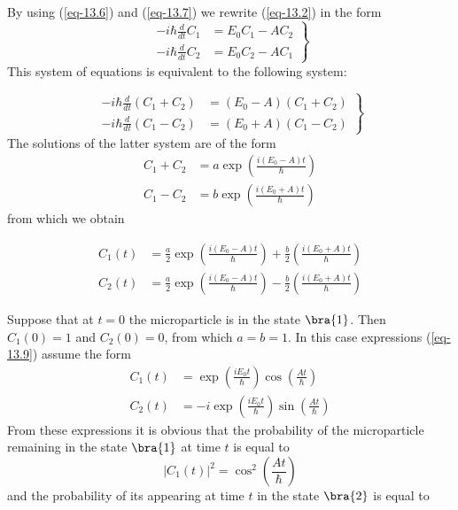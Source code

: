 \documentclass[a4paper,sfsidenotes,colorlinks=true]{tufte-book}
\numberwithin{equation}{section}
\numberwithin{figure}{section}
\begin{document}
\begin{description}
By using (\ref{eq-13.6}) and (\ref{eq-13.7})  we rewrite (\ref{eq-13.2}) in the form 
\begin{equation}%
\left.
\begin{split}
- i \hbar \frac{d}{dt} C_{1} & = E_{0}C_{1} - AC_{2} \\
- i \hbar \frac{d}{dt} C_{2} & = E_{0}C_{2} - AC_{1}
\end{split}
\right\}
\label{eq-13.8}
\end{equation}
This system of equations is equivalent to the following system:

\begin{equation*}%
\left.
\begin{split}
- i \hbar \frac{d}{dt} \left( C_{1} +  C_{2} \right) & = (E_{0} - A)( C_{1} +C_{2}) \\
- i \hbar \frac{d}{dt} \left( C_{1} -  C_{2} \right) & = (E_{0} + A)(
C_{1} - C_{2})
\end{split}
\right\}
\end{equation*}
The solutions of the latter system are of the form
\begin{equation*}%
\begin{split}
C_{1} +  C_{2} & = a \exp \left( \frac{i (E_{0} - A) t}{\hbar} \right)
\\
C_{1} -  C_{2} & = b \exp \left( \frac{i (E_{0} + A) t}{\hbar} \right) 
\end{split}
\end{equation*}
from which we obtain 

\begin{align}%
C_{1} (t) & = \frac{a}{2} \exp \left( \frac{i (E_{0} - A) t}{\hbar}
\right) + \frac{b}{2}\left( \frac{i (E_{0} + A) t}{\hbar} \right) 
\tag{13.9a}
\\
C_{2} (t) & = \frac{a}{2} \exp \left( \frac{i (E_{0} - A) t}{\hbar}
\right) - \frac{b}{2}\left( \frac{i (E_{0} + A) t}{\hbar} \right) 
\tag{13.9b}
\label{eq-13.9}
\end{align}

Suppose that at $t= 0$ the microparticle is in the state
$\bra{1}$. Then $C_{1} (0) = 1$ and $C_{2} (0) = 0$, from which $a = b
= 1$. In this case expressions (\ref{eq-13.9}) assume the form
\begin{align}%
C_{1} (t) & = \exp \left( \frac{i E_{0} t}{\hbar} \right) \cos \left(
  \frac{At}{\hbar} \right)
\tag{13.10a}
\\
C_{2} (t) & = -i \exp \left( \frac{i E_{0} t}{\hbar} \right) \sin \left(
  \frac{At}{\hbar} \right)
\tag{13.10b}
\label{eq-13.10}
\end{align}
From these expressions it is obvious that the probability of the
microparticle remaining in the state $\bra{1}$ at time $t$ is equal to
\begin{equation}%
|C_{1} (t)|^{2} = \cos^{2} \left( \frac{At}{\hbar} \right) 
\tag{13.11a}
\label{eq-13.11a}
\end{equation}
and the probability of its appearing at time $t$ in the
  state $\bra{2}$ is equal to


\end{description}
\end{document}
